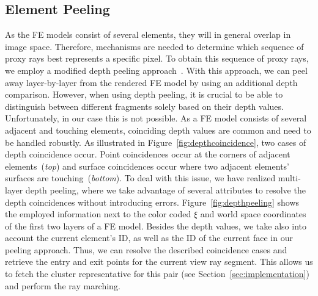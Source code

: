 \documentclass[journal]{vgtc}                %
\begin{document}
\subsection{Element Peeling}\label{subsec:peeling}
As the FE models consist of several elements, they will in general overlap in image space. Therefore, mechanisms are needed to determine which sequence of proxy rays best represents a specific pixel. To obtain this sequence of proxy rays, we employ a modified depth peeling approach~\cite{mammen89DepthPeeling}. With this approach, we can peel away layer-by-layer from the rendered FE model by using an additional depth comparison. However, when using depth peeling, it is crucial to be able to distinguish between different fragments solely based on their depth values. Unfortunately, in our case this is not possible. As a FE model consists of several adjacent and touching elements, coinciding depth values are common and need to be handled robustly. As illustrated in Figure~\ref{fig:depthcoincidence}, two cases of depth coincidence occur. Point coincidences occur at the corners of adjacent elements~({\it top}) and surface coincidences occur where two adjacent elements' surfaces are touching~({\it bottom}). To deal with this issue, we have realized multi-layer depth peeling, where we take advantage of several attributes to resolve the depth coincidences without introducing errors. Figure~\ref{fig:depthpeeling} shows the employed information next to the color coded $\xi$ and world space coordinates of the first two layers of a FE model. Besides the depth values, we take also into account the current element's ID, as well as the ID of the current face in our peeling approach. Thus, we can resolve the described coincidence cases and retrieve the entry and exit points for the current view ray segment. This allows us to fetch the cluster representative for this pair (see Section~\ref{sec:implementation}) and perform the ray marching.
%
%
%
\end{document}
